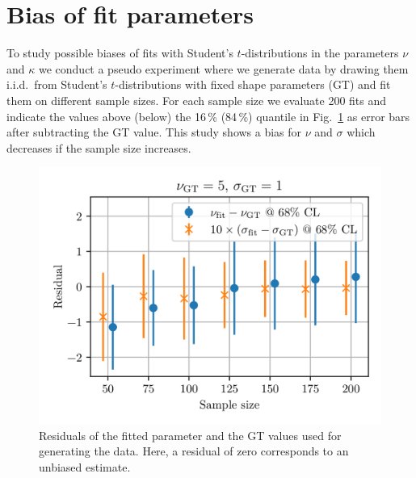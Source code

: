 \documentclass{article}
\begin{document}
\section{Bias of fit parameters}
\label{sec:appendix_nubias}
To study possible biases of fits with Student's $t$-distributions in the parameters $\nu$ and $\kappa$ we conduct a pseudo experiment where we generate data by drawing them i.i.d.\ from Student's $t$-distributions with fixed shape parameters (GT) and fit them on different sample sizes. 
For each sample size we evaluate 200 fits and indicate the values above (below) the 16\,\% (84\,\%) quantile in Fig.~\ref{fig:res} as error bars after subtracting the GT value.
This study shows a bias for $\nu$ and $\sigma$ which decreases if the sample size increases.
\begin{figure}[htbp]
    \centering
    \includegraphics[scale=.8]{res.png}
    \caption{Residuals of the fitted parameter and the GT values used for generating the data. Here, a residual of zero corresponds to an unbiased estimate.}
    \label{fig:res}
\end{figure}

\newpage
\end{document}
